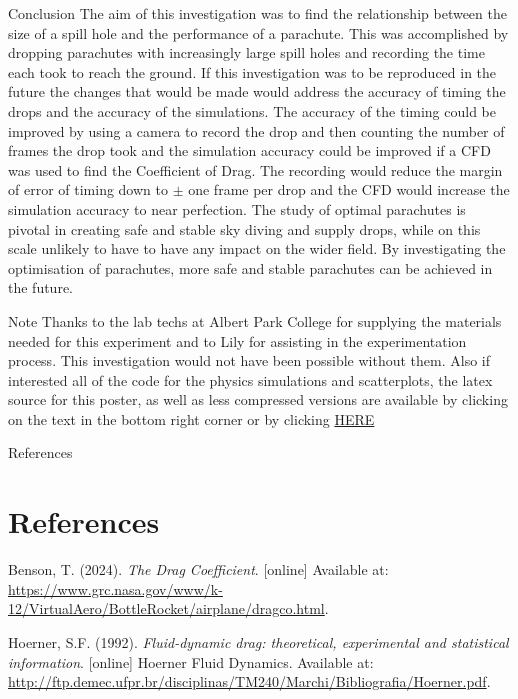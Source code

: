\documentclass[final]{beamer}
\newlength{\colwidth}
\begin{document}
\begin{frame}[t]
\begin{columns}[t]
\begin{column}{\colwidth}
  \begin{block}{Conclusion}
The aim of this investigation was to find the relationship between the size of a spill hole and the performance of a parachute. This was accomplished by dropping parachutes with increasingly large spill holes and recording the time each took to reach the ground. If this investigation was to be reproduced in the future the changes that would be made would address the accuracy of timing the drops and the accuracy of the simulations. The accuracy of the timing could be improved by using a camera to record the drop and then counting the number of frames the drop took and the simulation accuracy could be  improved if a CFD was used to find the Coefficient of Drag. The recording would reduce the margin of error of timing down to $\pm $ one frame per drop and the CFD would increase the simulation accuracy to near perfection. The study of optimal parachutes is pivotal in creating safe and stable sky diving and supply drops, while on this scale unlikely to have to have any impact on the wider field. By investigating the optimisation of parachutes, more safe and stable parachutes can be achieved in the future. 
\end{block}
\begin{block}{Note}
Thanks to the lab techs at Albert Park College for supplying the materials needed for this experiment and to Lily for assisting in the experimentation process. This investigation would not have been possible without them. Also if interested all of the code for the physics simulations and scatterplots, the latex source for this poster, as well as less compressed versions are available by clicking on the text in the bottom right corner or by clicking  \href{https://github.com/Technically-Not-The-Worst/Physics-Simulation}{HERE}
  \end{block}

  \begin{block}{References}

\section*{References}
\begingroup
\scriptsize
\begin{thebibliography}{9}

Benson, T. (2024). \emph{The Drag Coefficient}. [online] Available at: \url{https://www.grc.nasa.gov/www/k-12/VirtualAero/BottleRocket/airplane/dragco.html}.

Hoerner, S.F. (1992). \emph{Fluid-dynamic drag: theoretical, experimental and statistical information}. [online] Hoerner Fluid Dynamics. Available at: \url{http://ftp.demec.ufpr.br/disciplinas/TM240/Marchi/Bibliografia/Hoerner.pdf}.


\end{thebibliography}
\end{block}
\end{column}
\end{columns}
\end{frame}
\end{document}
